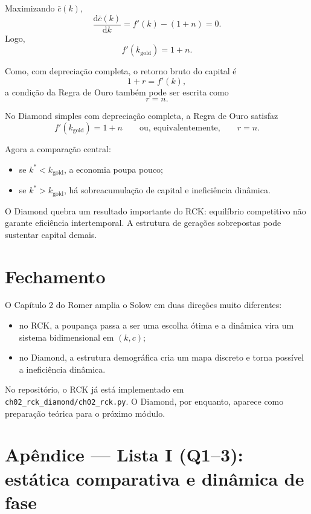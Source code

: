 \documentclass[11pt,a4paper]{article}
\newcommand{\dd}{\mathrm{d}}
\begin{document}
Maximizando \(\bar c(k)\),
\[
\frac{\dd \bar c(k)}{\dd k}=f'(k)-(1+n)=0.
\]
Logo,
\[
f'(k_{\text{gold}})=1+n.
\]

Como, com deprecia\c{c}\~ao completa, o retorno bruto do capital \'e
\[
1+r=f'(k),
\]
a condi\c{c}\~ao da Regra de Ouro tamb\'em pode ser escrita como
\[
r=n.
\]

\begin{resultado}
No Diamond simples com deprecia\c{c}\~ao completa, a Regra de Ouro satisfaz
\[
f'(k_{\text{gold}})=1+n
\qquad \text{ou, equivalentemente,} \qquad
r=n.
\]
\end{resultado}

Agora a compara\c{c}\~ao central:
\begin{itemize}
  \item se \(k^\ast<k_{\text{gold}}\), a economia poupa pouco;
  \item se \(k^\ast>k_{\text{gold}}\), h\'a sobreacumula\c{c}\~ao de capital e
  inefici\^encia din\^amica.
\end{itemize}

\begin{intuicao}
O Diamond quebra um resultado importante do RCK: equil\'ibrio competitivo n\~ao
garante efici\^encia intertemporal. A estrutura de gera\c{c}\~oes sobrepostas
pode sustentar capital demais.
\end{intuicao}

\section{Fechamento}

O Cap\'itulo 2 do Romer amplia o Solow em duas dire\c{c}\~oes muito diferentes:
\begin{itemize}
  \item no RCK, a poupan\c{c}a passa a ser uma escolha \'otima e a din\^amica vira
  um sistema bidimensional em \((k,c)\);
  \item no Diamond, a estrutura demogr\'afica cria um mapa discreto e torna
  poss\'ivel a inefici\^encia din\^amica.
\end{itemize}

No reposit\'orio, o RCK j\'a est\'a implementado em
\texttt{ch02\_rck\_diamond/ch02\_rck.py}. O Diamond, por enquanto, aparece
como prepara\c{c}\~ao te\'orica para o pr\'oximo m\'odulo.

\newpage
\section{Ap\^endice --- Lista I (Q1--3): estática comparativa e dinâmica de fase}
\end{document}
